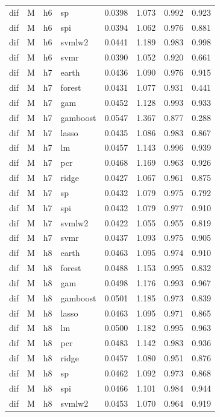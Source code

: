 \begin{ThreePartTable}
\begin{longtable}[t]{llclcccc}
dif & M & h6 & sp & 0.0398 & 1.073 & 0.992 & 0.923\\
dif & M & h6 & spi & 0.0394 & 1.062 & 0.976 & 0.881\\
dif & M & h6 & svmlw2 & 0.0441 & 1.189 & 0.983 & 0.998\\
dif & M & h6 & svmr & 0.0390 & 1.052 & 0.920 & 0.661\\
\addlinespace
dif & M & h7 & earth & 0.0436 & 1.090 & 0.976 & 0.915\\
dif & M & h7 & forest & 0.0431 & 1.077 & 0.931 & 0.441\\
dif & M & h7 & gam & 0.0452 & 1.128 & 0.993 & 0.933\\
dif & M & h7 & gamboost & 0.0547 & 1.367 & 0.877 & 0.288\\
dif & M & h7 & lasso & 0.0435 & 1.086 & 0.983 & 0.867\\
dif & M & h7 & lm & 0.0457 & 1.143 & 0.996 & 0.939\\
dif & M & h7 & pcr & 0.0468 & 1.169 & 0.963 & 0.926\\
dif & M & h7 & ridge & 0.0427 & 1.067 & 0.961 & 0.875\\
dif & M & h7 & sp & 0.0432 & 1.079 & 0.975 & 0.792\\
dif & M & h7 & spi & 0.0432 & 1.079 & 0.977 & 0.910\\
dif & M & h7 & svmlw2 & 0.0422 & 1.055 & 0.955 & 0.819\\
dif & M & h7 & svmr & 0.0437 & 1.093 & 0.975 & 0.905\\
\addlinespace
dif & M & h8 & earth & 0.0463 & 1.095 & 0.974 & 0.910\\
dif & M & h8 & forest & 0.0488 & 1.153 & 0.995 & 0.832\\
dif & M & h8 & gam & 0.0498 & 1.176 & 0.993 & 0.967\\
dif & M & h8 & gamboost & 0.0501 & 1.185 & 0.973 & 0.839\\
dif & M & h8 & lasso & 0.0463 & 1.095 & 0.971 & 0.865\\
dif & M & h8 & lm & 0.0500 & 1.182 & 0.995 & 0.963\\
dif & M & h8 & pcr & 0.0483 & 1.142 & 0.983 & 0.936\\
dif & M & h8 & ridge & 0.0457 & 1.080 & 0.951 & 0.876\\
dif & M & h8 & sp & 0.0462 & 1.092 & 0.973 & 0.868\\
dif & M & h8 & spi & 0.0466 & 1.101 & 0.984 & 0.944\\
dif & M & h8 & svmlw2 & 0.0453 & 1.070 & 0.964 & 0.919\\

\end{longtable}
\end{ThreePartTable}
